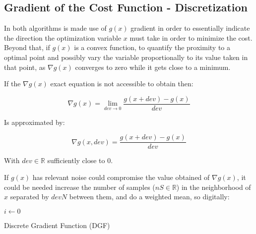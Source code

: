 \subsection{Gradient of the Cost Function - Discretization}
\label{subsec:Gradient_Cost_Function_Discretization}

In both algorithms is made use of \(g(x)\) gradient in order to essentially indicate the direction the optimization variable \(x\) must take in order to minimize the cost. Beyond that, if \(g(x)\) is a convex function, to quantify the proximity to a optimal point and possibly vary the variable proportionally to its value taken in that point, as \(\nabla g(x)\) converges to zero while it gets close to a minimum. \par
If the \(\nabla g(x)\) exact equation is not accessible to obtain then:

\begin{equation}
    \nabla g(x) = \lim_{dev \to 0} \frac{g(x + dev) - g(x)}{dev}
    \label{eq:Gradient_formula}
\end{equation}

Is approximated by:

\begin{equation}
    \nabla g(x, dev) = \frac{g(x + dev) - g(x)}{dev}
    \label{eq:Gradient_Discretization}
\end{equation}

With \(dev \in \mathbb{R}\) sufficiently close to \(0\). \par

If \(g(x)\) has relevant noise could compromise the value obtained of \(\nabla g(x)\), it could be needed increase the number of samples (\(nS \in \mathbb{R}\)) in the neighborhood of \(x\) separated by \(devN\) between them, and do a weighted mean, so digitally:
  \begin{algorithm}
    $i\gets 0$\;
    \caption{Discrete Gradient Function (DGF)} \label{alg:Discrete_Gradient_Function}
  \end{algorithm}

